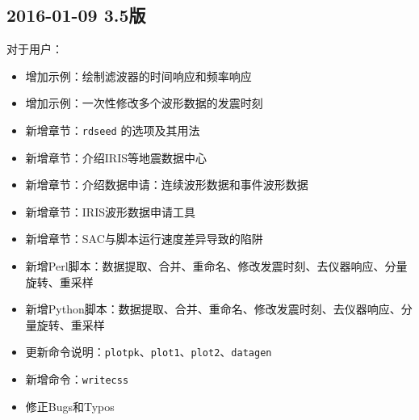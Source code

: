 \subsection*{2016-01-09 3.5版}
对于用户：
\begin{itemize}
\item 增加示例：绘制滤波器的时间响应和频率响应
\item 增加示例：一次性修改多个波形数据的发震时刻
\item 新增章节：\texttt{rdseed} 的选项及其用法
\item 新增章节：介绍IRIS等地震数据中心
\item 新增章节：介绍数据申请：连续波形数据和事件波形数据
\item 新增章节：IRIS波形数据申请工具
\item 新增章节：SAC与脚本运行速度差异导致的陷阱
\item 新增Perl脚本：数据提取、合并、重命名、修改发震时刻、去仪器响应、分量旋转、重采样
\item 新增Python脚本：数据提取、合并、重命名、修改发震时刻、去仪器响应、分量旋转、重采样
\item 更新命令说明：\texttt{plotpk}、\texttt{plot1}、\texttt{plot2}、\texttt{datagen}
\item 新增命令：\texttt{writecss}
\item 修正Bugs和Typos
\end{itemize}
